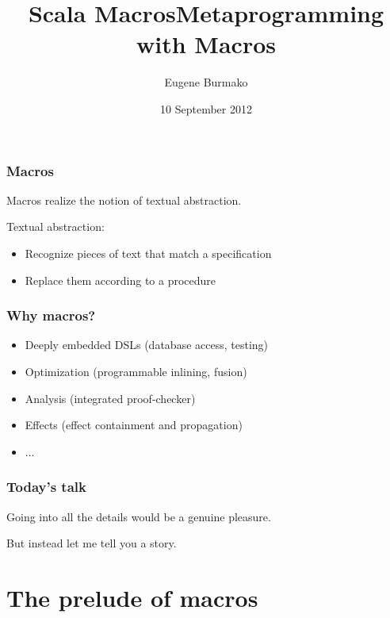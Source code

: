 \documentclass[hyperref={bookmarks=false}]{beamer}
\title{Scala Macros}
\begin{document}
\title{Metaprogramming with Macros}
\author{Eugene Burmako}
\date{10 September 2012}
{
\begin{frame}
  \titlepage
\end{frame}
}

\begin{frame}[fragile]
\frametitle{Macros}
\pause
Macros realize the notion of textual abstraction.

Textual abstraction:
\begin{itemize}
\item Recognize pieces of text that match a specification
\item Replace them according to a procedure
\end{itemize}
\end{frame}

\begin{frame}[fragile]
\frametitle{Why macros?}
\begin{itemize}
\item Deeply embedded DSLs (database access, testing)
\item Optimization (programmable inlining, fusion)
\item Analysis (integrated proof-checker)
\item Effects (effect containment and propagation)
\item ...
\end{itemize}
\end{frame}

\begin{frame}[fragile]
\frametitle{Today's talk}

Going into all the details would be a genuine pleasure.

But instead let me tell you a story.
\end{frame}



\section{The prelude of macros}
\end{document}
